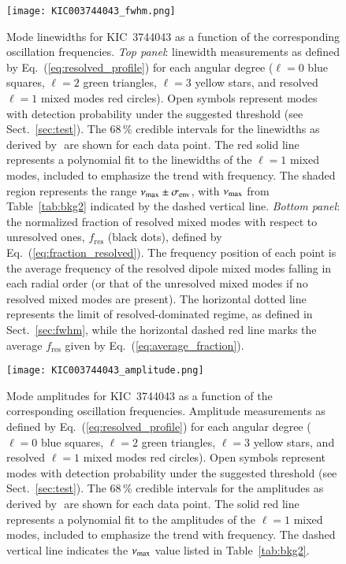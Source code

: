 \clearpage

\begin{figure}
   \centering
   \texttt{[image: KIC003744043\_fwhm.png]}
      \caption{Mode linewidths for KIC~3744043 as a function of the corresponding oscillation frequencies. \textit{Top panel}: linewidth measurements as defined by Eq.~(\ref{eq:resolved_profile}) for each angular degree ($\ell = 0$ blue squares, $\ell = 2$ green triangles, $\ell = 3$ yellow stars, and resolved $\ell = 1$ mixed modes red circles). Open symbols represent modes with detection probability under the suggested threshold (see Sect.~\ref{sec:test}). The 68\,\% credible intervals for the linewidths as derived by \diamonds\,\,are shown for each data point. The red solid line represents a polynomial fit to the linewidths of the $\ell = 1$ mixed modes, included to emphasize the trend with frequency. The shaded region represents the range $\nu_\mathrm{max} \pm \sigma_\mathrm{env}$, with $\nu_\mathrm{max}$ from Table~\ref{tab:bkg2} indicated by the dashed vertical line. \textit{Bottom panel}: the normalized fraction of resolved mixed modes with respect to unresolved ones, $f_\mathrm{res}$ (black dots), defined by Eq.~(\ref{eq:fraction_resolved}). The frequency position of each point is the average frequency of the resolved dipole mixed modes falling in each radial order (or that of the unresolved mixed modes if no resolved mixed modes are present). The horizontal dotted line represents the limit of resolved-dominated regime, as defined in Sect.~\ref{sec:fwhm}, while the horizontal dashed red line marks the average $f_\mathrm{res}$ given by Eq.~(\ref{eq:average_fraction}).}
    \label{fig:3744043fwhm}
\end{figure}

\begin{figure}
   \centering
   \texttt{[image: KIC003744043\_amplitude.png]}
      \caption{Mode amplitudes for KIC~3744043 as a function of the corresponding oscillation frequencies. Amplitude measurements as defined by Eq.~(\ref{eq:resolved_profile}) for each angular degree ($\ell = 0$ blue squares, $\ell = 2$ green triangles, $\ell = 3$ yellow stars, and resolved $\ell = 1$ mixed modes red circles). Open symbols represent modes with detection probability under the suggested threshold (see Sect.~\ref{sec:test}). The 68\,\% credible intervals for the amplitudes as derived by \diamonds\,\,are shown for each data point. The solid red line represents a polynomial fit to the amplitudes of the $\ell = 1$ mixed modes, included to emphasize the trend with frequency. The dashed vertical line indicates the $\nu_\mathrm{max}$ value listed in Table~\ref{tab:bkg2}.}
    \label{fig:3744043amplitude}
\end{figure}
\clearpage



